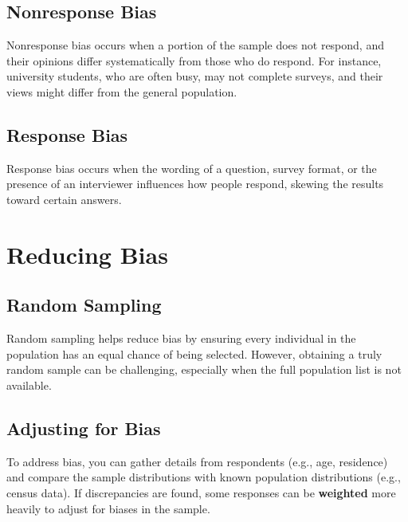 \documentclass{article}
\begin{document}
\subsection{Nonresponse Bias}
Nonresponse bias occurs when a portion of the sample does not respond, and their opinions differ systematically from those who do respond. For instance, university students, who are often busy, may not complete surveys, and their views might differ from the general population.

\subsection{Response Bias}
Response bias occurs when the wording of a question, survey format, or the presence of an interviewer influences how people respond, skewing the results toward certain answers.

\section{Reducing Bias}

\subsection{Random Sampling}
Random sampling helps reduce bias by ensuring every individual in the population has an equal chance of being selected. However, obtaining a truly random sample can be challenging, especially when the full population list is not available.

\subsection{Adjusting for Bias}
To address bias, you can gather details from respondents (e.g., age, residence) and compare the sample distributions with known population distributions (e.g., census data). If discrepancies are found, some responses can be \textbf{weighted} more heavily to adjust for biases in the sample.
\end{document}
